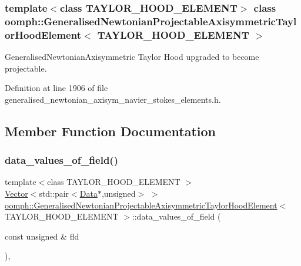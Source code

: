 \subsubsection*{template$<$class T\+A\+Y\+L\+O\+R\+\_\+\+H\+O\+O\+D\+\_\+\+E\+L\+E\+M\+E\+NT$>$\newline
class oomph\+::\+Generalised\+Newtonian\+Projectable\+Axisymmetric\+Taylor\+Hood\+Element$<$ T\+A\+Y\+L\+O\+R\+\_\+\+H\+O\+O\+D\+\_\+\+E\+L\+E\+M\+E\+N\+T $>$}

Generalised\+Newtonian\+Axisymmetric Taylor Hood upgraded to become projectable. 

Definition at line 1906 of file generalised\+\_\+newtonian\+\_\+axisym\+\_\+navier\+\_\+stokes\+\_\+elements.\+h.



\subsection{Member Function Documentation}
\mbox{\label{classoomph_1_1GeneralisedNewtonianProjectableAxisymmetricTaylorHoodElement_a89cf2117918a1d5074e26bb386aac730}} 
\subsubsection{\texorpdfstring{data\+\_\+values\+\_\+of\+\_\+field()}{data\_values\_of\_field()}}
{\footnotesize\ttfamily template$<$class T\+A\+Y\+L\+O\+R\+\_\+\+H\+O\+O\+D\+\_\+\+E\+L\+E\+M\+E\+NT $>$ \\
\hyperlink{classoomph_1_1Vector}{Vector}$<$std\+::pair$<$\hyperlink{classoomph_1_1Data}{Data}$\ast$,unsigned$>$ $>$ \hyperlink{classoomph_1_1GeneralisedNewtonianProjectableAxisymmetricTaylorHoodElement}{oomph\+::\+Generalised\+Newtonian\+Projectable\+Axisymmetric\+Taylor\+Hood\+Element}$<$ T\+A\+Y\+L\+O\+R\+\_\+\+H\+O\+O\+D\+\_\+\+E\+L\+E\+M\+E\+NT $>$\+::data\+\_\+values\+\_\+of\+\_\+field (\begin{DoxyParamCaption}\item[{const unsigned \&}]{fld }\end{DoxyParamCaption})\hspace{0.3cm}{\ttfamily [inline]}, {\ttfamily [virtual]}}



